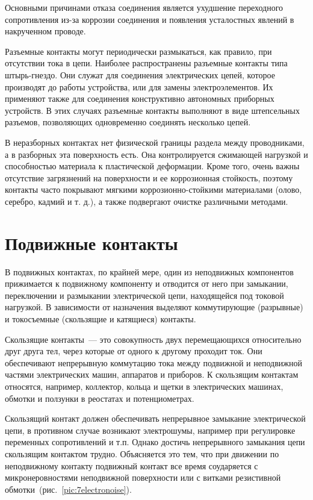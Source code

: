 Основными причинами отказа соединения является ухудшение переходного сопротивления из-за коррозии соединения и появления усталостных явлений в накрученном проводе.

Разъемные контакты могут периодически размыкаться, как правило, при отсутствии тока в цепи. Наиболее распространены разъемные контакты типа штырь-гнездо. Они служат для соединения электрических цепей, которое производят до работы устройства, или для замены электроэлементов. Их применяют также для соединения конструктивно автономных приборных устройств. В этих случаях разъемные контакты выполняют в виде штепсельных разъемов, позволяющих одновременно соединять несколько цепей. 

В неразборных контактах нет физической границы раздела между проводниками, а в разборных эта поверхность есть. Она контролируется сжимающей нагрузкой и способностью материала к пластической деформации. Кроме того, очень важны отсутствие загрязнений на поверхности и ее коррозионная стойкость, поэтому контакты часто покрывают мягкими коррозионно-стойкими материалами (олово, серебро, кадмий и т. д.), а также подвергают очистке различными методами.

\section{Подвижные контакты }

В подвижных контактах, по крайней мере, один из неподвижных компонентов прижимается к подвижному компоненту и отводится от него при замыкании, переключении и размыкании электрической цепи, находящейся под токовой нагрузкой. В зависимости от назначения выделяют коммутирующие (разрывные) и токосъемные (скользящие и катящиеся) контакты. 

Скользящие контакты~--- это совокупность двух перемещающихся относительно друг друга тел, через которые от одного к другому проходит ток. Они обеспечивают непрерывную коммутацию тока между подвижной и неподвижной частями электрических машин, аппаратов и приборов. К скользящим контактам относятся, например, коллектор, кольца и щетки в электрических машинах, обмотки и ползунки в реостатах и потенциометрах. 

Скользящий контакт должен обеспечивать непрерывное замыкание электрической цепи, в противном случае возникают электрошумы, например при регулировке переменных сопротивлений и т.п. Однако достичь непрерывного замыкания цепи скользящим контактом трудно. Объясняется это тем, что при движении по неподвижному контакту подвижный контакт все время соударяется с микронеровностями неподвижной поверхности или с витками резистивной обмотки~(рис.~\ref{pic:7electronoise}). 

